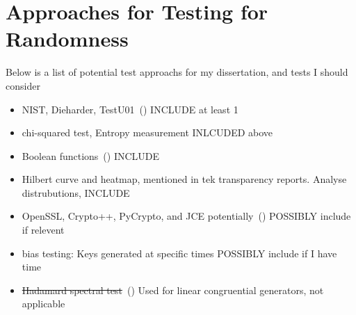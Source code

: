 \section{Approaches for Testing for Randomness}
\label{sec:TestApproachs}

Below is a list of potential test approachs for my dissertation, and tests I should consider
\begin{itemize}
    \item NIST, Dieharder, TestU01~(\cite{10.1145/3447773}) INCLUDE at least 1
    \item chi-squared test, Entropy measurement INLCUDED above
    \item Boolean functions~(\cite{10.1145/3205455.3205518}) INCLUDE
    \item Hilbert curve and heatmap, mentioned in tek transparency reports. Analyse distrubutions, INCLUDE
    \item OpenSSL, Crypto++, PyCrypto, and JCE potentially~(\cite{linkedInArticle}) POSSIBLY include if relevent
    \item bias testing: Keys generated at specific times POSSIBLY include if I have time
    \item \sout{Hadamard spectral test}~(\cite{WIKI}) Used for linear congruential generators, not applicable
\end{itemize}